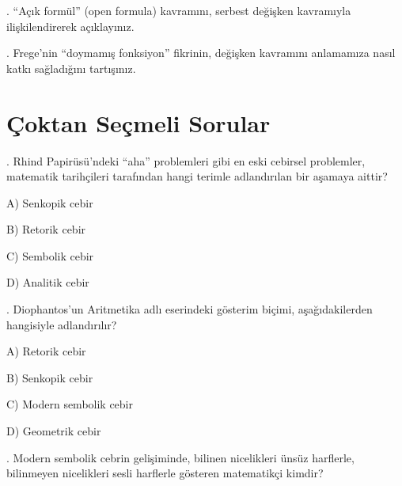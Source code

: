 \par{}. “Açık formül” (open formula) kavramını, serbest değişken kavramıyla ilişkilendirerek açıklayınız.

\par{}. Frege’nin “doymamış fonksiyon” fikrinin, değişken kavramını anlamamıza nasıl katkı sağladığını tartışınız.

\section*{Çoktan Seçmeli Sorular}

\par\smallskip{}. Rhind Papirüsü’ndeki “aha” problemleri gibi en eski cebirsel problemler, matematik tarihçileri tarafından hangi terimle adlandırılan bir aşamaya aittir?

\par\noindent\hspace*{1.6em}A) Senkopik cebir

\par\noindent\hspace*{1.6em}B) Retorik cebir

\par\noindent\hspace*{1.6em}C) Sembolik cebir

\par\noindent\hspace*{1.6em}D) Analitik cebir

\par\smallskip{}. Diophantos’un Aritmetika adlı eserindeki gösterim biçimi, aşağıdakilerden hangisiyle adlandırılır?

\par\noindent\hspace*{1.6em}A) Retorik cebir

\par\noindent\hspace*{1.6em}B) Senkopik cebir

\par\noindent\hspace*{1.6em}C) Modern sembolik cebir

\par\noindent\hspace*{1.6em}D) Geometrik cebir

\par\smallskip{}. Modern sembolik cebrin gelişiminde, bilinen nicelikleri ünsüz harflerle, bilinmeyen nicelikleri sesli harflerle gösteren matematikçi kimdir?

